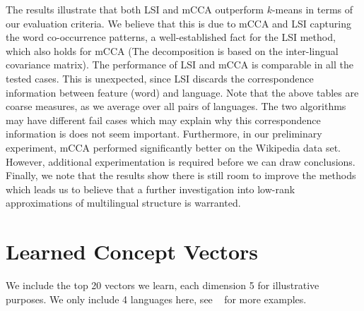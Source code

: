 \documentclass{article} %
\begin{document}
The results illustrate that both LSI and mCCA outperform
$k$-means in terms of our evaluation criteria. We believe that
this is due to mCCA and LSI capturing the word co-occurrence
patterns, a well-established fact for the LSI method, which also
holds for mCCA (The decomposition is based on the inter-lingual
covariance matrix). The performance of LSI and mCCA is comparable
in all the tested cases. This is unexpected, since LSI discards
the correspondence information between feature (word) and
language. Note that the above tables are coarse measures, as we
average over all pairs of languages. The two algorithms may have
different fail cases which may explain why this correspondence
information is does not seem important. Furthermore, in our
preliminary experiment, mCCA performed significantly better on
the Wikipedia data set. However, additional experimentation is
required before we can draw conclusions. Finally, we note that
the results show there is still room to improve the methods which
leads us to believe that a further investigation into low-rank
approximations of multilingual structure is warranted.

 


\pagebreak
\appendix

\section{Learned Concept Vectors}
We include the top 20 vectors we learn, each dimension 5 for
illustrative purposes. We only include 4 languages here, see
~\cite{full_version} for more examples.
\end{document}
